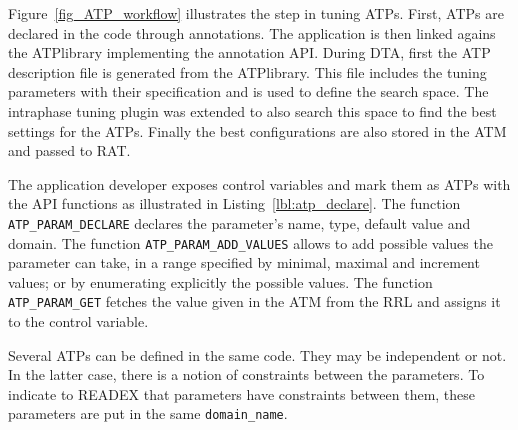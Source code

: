 Figure~\ref{fig_ATP_workflow} illustrates the step in tuning ATPs. First, ATPs are declared in the code through annotations. The application is then linked agains the ATPlibrary implementing the annotation API. During DTA, first the ATP description file is generated from the ATPlibrary. This file includes the tuning parameters with their specification and is used to define the search space. The intraphase tuning plugin was extended to also search this space to find the best settings for the ATPs. Finally the best configurations are also stored in the ATM and passed to RAT.

The application developer exposes control variables and mark them as ATPs with the API functions as illustrated in Listing~\ref{lbl:atp_declare}. The function \texttt{ATP\_PARAM\_DECLARE} declares the parameter's name, type, default value and domain. The function \texttt{ATP\_PARAM\_ADD\_VALUES} allows to add possible values the parameter can take, in a range specified by minimal, maximal and increment values; or by enumerating explicitly the possible values. The function \texttt{ATP\_PARAM\_GET} fetches the value given in the ATM from the RRL and assigns it to the control variable. 

Several ATPs can be defined in the same code. They may be independent or not. In the latter case, there is a notion of constraints between the parameters. To indicate to READEX that parameters have constraints between them, these parameters are put in the same \texttt{domain\_name}.



